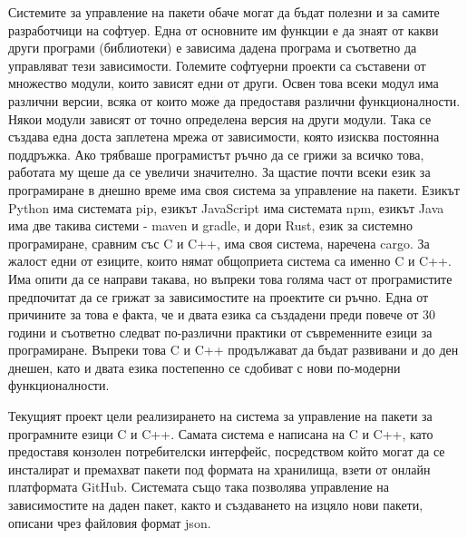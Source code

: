 Системите за управление на пакети обаче могат да бъдат полезни и за самите
разработчици на софтуер. Една от основните им функции е да знаят от какви други
програми (библиотеки) е зависима дадена програма и съответно да управляват тези
зависимости. Големите софтуерни проекти са съставени от множество модули, които
зависят едни от други. Освен това всеки модул има различни версии, всяка от
които може да предоставя различни функционалности. Някои модули зависят от точно
определена версия на други модули. Така се създава една доста заплетена мрежа от
зависимости, която изисква постоянна поддръжка. Ако трябваше програмистът ръчно
да се грижи за всичко това, работата му щеше да се увеличи значително. За щастие
почти всеки език за програмиране в днешно време има своя система за управление
на пакети. Езикът Python има системата pip, езикът JavaScript има системата npm,
езикът Java има две такива системи - maven и gradle, и дори Rust, език за
системно програмиране, сравним със C и C++, има своя система, наречена cargo.
За жалост едни от езиците, които нямат общоприета система са именно C и C++. Има
опити да се направи такава, но въпреки това голяма част от програмистите
предпочитат да се грижат за зависимостите на проектите си ръчно. Една от
причините за това е факта, че и двата езика са създадени преди повече от 30
години и съответно следват по-различни практики от съвременните езици за
програмиране. Въпреки това C и C++ продължават да бъдат развивани и до ден
днешен, като и двата езика постепенно се сдобиват с нови по-модерни
функционалности.

Текущият проект цели реализирането на система за управление на пакети за
програмните езици C и C++. Самата система е написана на C и C++, като предоставя
конзолен потребителски интерфейс, посредством който могат да се инсталират и
премахват пакети под формата на хранилища, взети от онлайн платформата GitHub.
Системата също така позволява управление на зависимостите на даден пакет, както
и създаването на изцяло нови пакети, описани чрез файловия формат
\acrshort{json}.
